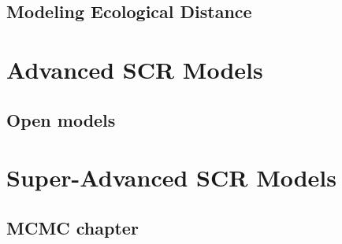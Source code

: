 \documentclass{book}
\begin{document}
\chapter{Modeling Ecological Distance}
\label{chapt.ecoldist}




\part{Advanced SCR Models}



%

\chapter{Open models}
\label{chapt.open}


\part{Super-Advanced SCR Models}

\chapter{MCMC chapter}
\label{chapt.mcmc}

%

%









\end{document}
